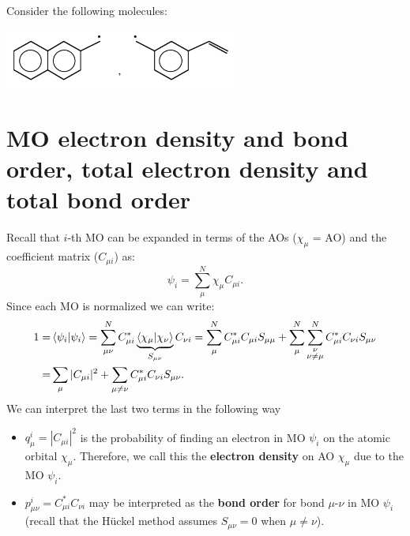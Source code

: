 \documentclass[../Main/chem532-notes.tex]{subfiles}
\begin{document}
\begin{example} Consider the following molecules:

\includegraphics[width=3in]{../huckel/c2_nbmo_ex3.png}

\end{example}

\section{MO electron density and bond order, total electron density and total bond order}
Recall that $i$-th MO can be expanded in terms of the AOs ($\chi_\mu$ = AO) and the coefficient matrix ($C_{\mu i}$) as:
\begin{equation}
\psi_i = \sum_\mu^{N} \chi_\mu C_{\mu i}.
\end{equation}
Since each MO is normalized we can write:
\begin{equation}
\begin{split}
1 = & \braket{\psi_i | \psi_i} = 
\sum_{\mu \nu}^N C_{\mu i}^*  \underbrace{\braket{\chi_\mu | \chi_\nu}}_{S_{\mu\nu}} C_{\nu i}
= \sum_{\mu}^N C_{\mu i}^* C_{\mu i}  S_{\mu\mu}
+ \sum_{\mu}^N \sum_{\substack{\nu\\ \nu \neq \mu}}^N C_{\mu i}^* C_{\nu i}  S_{\mu\nu} \\
= & \sum_{\mu} |C_{\mu i}|^2 + \sum_{\mu \neq \nu} C_{\mu i}^* C_{\nu i}  S_{\mu\nu}.
\end{split}
\end{equation}
We can interpret the last two terms in the following way
\begin{itemize}
\item $q^i_\mu = |C_{\mu i}|^2$ is the probability of finding an electron in MO $\psi_i$ on the atomic orbital $\chi_\mu$. Therefore, we call this the \textbf{electron density} on AO $\chi_\mu$ due to the MO $\psi_i$.

\item $p_{\mu \nu}^i = C_{\mu i}^* C_{\nu i}$ may be interpreted as the \textbf{bond order} for bond $\mu$-$\nu$ in MO $\psi_i$ (recall that the H\"{u}ckel method assumes $S_{\mu\nu} = 0$ when $\mu \neq \nu$).
\end{itemize}
\end{document}
